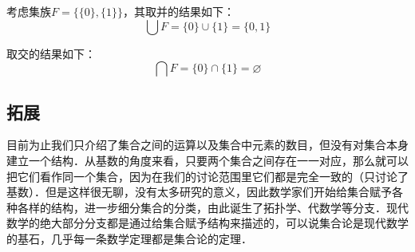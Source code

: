 \begin{example}{}
考虑集族$F=\{\{0\}, \{1\}\}$，其取并的结果如下：
\begin{equation}
\bigcup F=\{0\}\cup\{1\}=\{0, 1\}
\end{equation}

取交的结果如下：
\begin{equation}
\bigcap F=\{0\}\cap\{1\}=\varnothing
\end{equation}
\end{example}



\subsection{拓展}
目前为止我们只介绍了集合之间的运算以及集合中元素的数目，但没有对集合本身建立一个结构．从基数的角度来看，只要两个集合之间存在一一对应，那么就可以把它们看作同一个集合，因为在我们的讨论范围里它们都是完全一致的（只讨论了基数）．但是这样很无聊，没有太多研究的意义，因此数学家们开始给集合赋予各种各样的结构，进一步细分集合的分类，由此诞生了拓扑学、代数学等分支．现代数学的绝大部分分支都是通过给集合赋予结构来描述的，可以说集合论是现代数学的基石，几乎每一条数学定理都是集合论的定理．
